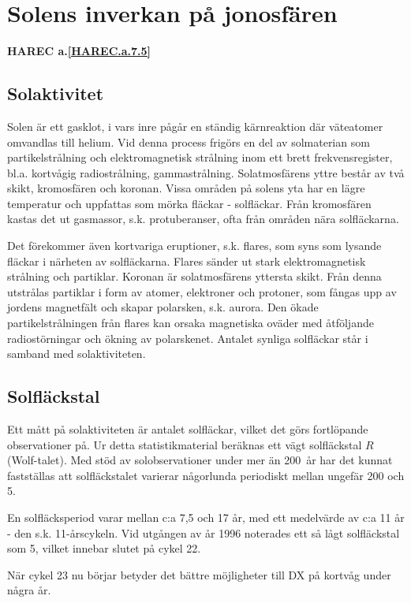 \section{Solens inverkan på jonosfären}
\textbf{
HAREC a.\ref{HAREC.a.7.5}\label{myHAREC.a.7.5}
}

\subsection{Solaktivitet}

Solen är ett gasklot, i vars inre pågår en ständig kärnreaktion där
väteatomer omvandlas till helium. Vid denna process frigörs en del av
solmaterian som partikelstrålning och elektromagnetisk strålning inom
ett brett frekvensregister, bl.a. kortvågig radiostrålning,
gammastrålning. Solatmosfärens yttre består av två skikt, kromosfären
och koronan. Vissa områden på solens yta har en lägre temperatur och
uppfattas som mörka fläckar - solfläckar. Från kromosfären kastas det
ut gasmassor, s.k. protuberanser, ofta från områden nära solfläckarna.

Det förekommer även kortvariga eruptioner, s.k. flares, som syns som
lysande fläckar i närheten av solfläckarna. Flares sänder ut stark
elektromagnetisk strålning och partiklar. Koronan är solatmosfärens
yttersta skikt. Från denna utstrålas partiklar i form av atomer,
elektroner och protoner, som fångas upp av jordens magnetfält och
skapar polarsken, s.k. aurora. Den ökade partikelstrålningen från
flares kan orsaka magnetiska oväder med åtföljande radiostörningar och
ökning av polarskenet. Antalet synliga solfläckar står i samband med
solaktiviteten.

\subsection{Solfläckstal}

Ett mått på solaktiviteten är antalet solfläckar, vilket det görs
fortlöpande observationer på. Ur detta statistikmaterial beräknas ett
vägt solfläckstal \(R\) (Wolf-talet). Med stöd av solobservationer
under mer än 200~år har det kunnat fastställas att solfläckstalet
varierar någorlunda periodiskt mellan ungefär 200 och 5.

En solfläcksperiod varar mellan c:a 7,5 och 17 år, med ett medelvärde
av c:a 11 år - den s.k. 11-årscykeln. Vid utgången av år 1996
noterades ett så lågt solfläckstal som 5, vilket innebar slutet på
cykel 22.

När cykel 23 nu börjar betyder det bättre möjligheter till DX på
kortvåg under några år.

